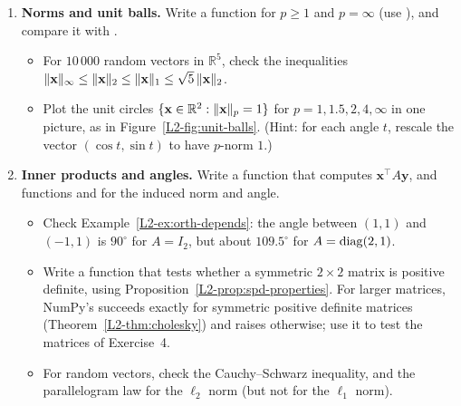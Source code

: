 \begin{enumerate}[label=\textbf{P\arabic*.}, leftmargin=*]
    \item \textbf{Norms and unit balls.} Write a function  for $p \geq 1$ and $p = \infty$ (use ), and compare it with .
    \begin{itemize}
        \item For $10\,000$ random vectors in $\mathbb{R}^5$, check the inequalities $\lVert \mathbf{x} \rVert_\infty \leq \lVert \mathbf{x} \rVert_2 \leq \lVert \mathbf{x} \rVert_1 \leq \sqrt{5}\, \lVert \mathbf{x} \rVert_2$.
        \item Plot the unit circles $\{\mathbf{x} \in \mathbb{R}^2 : \lVert \mathbf{x} \rVert_p = 1\}$ for $p = 1, 1.5, 2, 4, \infty$ in one picture, as in Figure~\ref{L2-fig:unit-balls}. (Hint: for each angle $t$, rescale the vector $(\cos t, \sin t)$ to have $p$-norm $1$.)
    \end{itemize}

    \item \textbf{Inner products and angles.} Write a function  that computes $\mathbf{x}^\top A \mathbf{y}$, and functions  and  for the induced norm and angle.
    \begin{itemize}
        \item Check Example~\ref{L2-ex:orth-depends}: the angle between $(1, 1)$ and $(-1, 1)$ is $90^\circ$ for $A = I_2$, but about $109.5^\circ$ for $A = \operatorname{diag}(2, 1)$.
        \item Write a function  that tests whether a symmetric $2 \times 2$ matrix is positive definite, using Proposition~\ref{L2-prop:spd-properties}. For larger matrices, NumPy's  succeeds exactly for symmetric positive definite matrices (Theorem~\ref{L2-thm:cholesky}) and raises  otherwise; use it to test the matrices of Exercise~4.
        \item For random vectors, check the Cauchy--Schwarz inequality, and the parallelogram law for the $\ell_2$ norm (but not for the $\ell_1$ norm).
    \end{itemize}


\end{enumerate}
